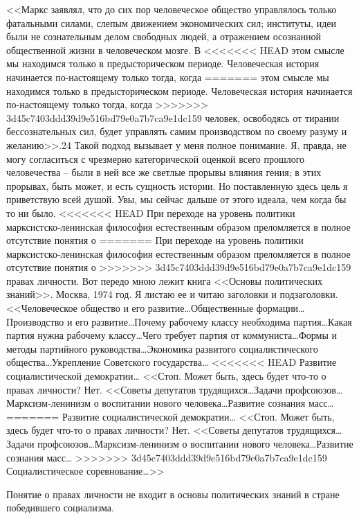 \documentclass{book}
\begin{document}
<<Маркс заявлял, что до сих пор человеческое общество управлялось только фатальными силами, слепым движением экономических сил; 
институты, идеи были не сознательным делом свободных людей, а отражением осознанной обществен­ной жизни в человеческом мозге. В 
<<<<<<< HEAD
этом смысле мы находим­ся только в предысторическом периоде. Человеческая история начинается по‑настоящему только тогда, когда 
=======
этом смысле мы находим­ся только в предысторическом периоде. Человеческая история начинается по-настоящему только тогда, когда 
>>>>>>> 3d45c7403ddd39d9e516bd79e0a7b7ca9e1dc159
человек, освободясь от тирании бессознательных сил, будет управлять самим производством по своему разуму и желанию>>.24
Такой подход вызывает у меня полное понимание. Я, правда, не могу согласиться с чрезмерно категорической оценкой всего прошлого 
человечества -- были в ней все же светлые прорывы влияния гения; в этих прорывах, быть может, и есть сущность истории. Но 
поставленную здесь цель я приветствую всей душой. Увы, мы сейчас дальше от этого идеала, чем когда бы то ни было.
<<<<<<< HEAD
При переходе на уровень политики марксистско‑ленинская философия естественным образом преломляется в полное отсутствие понятия о 
=======
При переходе на уровень политики марксистско-ленинская философия естественным образом преломляется в полное отсутствие понятия о 
>>>>>>> 3d45c7403ddd39d9e516bd79e0a7b7ca9e1dc159
правах личности. Вот передо мною лежит книга <<Основы политических знаний>>. Москва, 1974 год. Я листаю ее и читаю заголовки и 
подзаголовки. <<Человеческое общество и его развитие\ldots Общественные формации\ldots Производство и его развитие\ldots Почему 
рабочему классу необходима партия\ldots Какая партия нужна рабочему классу\ldots Чего требует партия от коммуниста\ldots Формы и 
методы партийного руко­водства\ldots Экономика развитого социалистического общества\ldots Укрепление Советского государства\ldots 
<<<<<<< HEAD
Развитие социалистиче­ской демократии… <<Стоп. Может быть, здесь будет что‑то о правах личности? Нет. <<Советы депутатов 
трудящихся\ldots Задачи профсоюзов\ldots Марксизм‑ленинизм о воспитании нового человека\ldots Развитие сознания масс\ldots 
=======
Развитие социалистиче­ской демократии… <<Стоп. Может быть, здесь будет что-то о правах личности? Нет. <<Советы депутатов 
трудящихся\ldots Задачи профсоюзов\ldots Марксизм-ленинизм о воспитании нового человека\ldots Развитие сознания масс\ldots 
>>>>>>> 3d45c7403ddd39d9e516bd79e0a7b7ca9e1dc159
Социалистическое соревнование\ldots>>

Понятие о правах личности не входит в основы политических знаний в стране победившего социализма.
\end{document}
